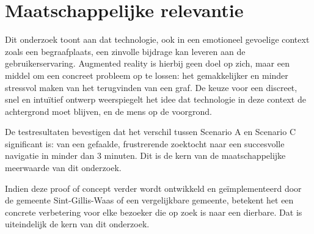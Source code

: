 \section{Maatschappelijke relevantie}

Dit onderzoek toont aan dat technologie, ook in een emotioneel gevoelige context
zoals een begraafplaats, een zinvolle bijdrage kan leveren aan de gebruikerservaring.
Augmented reality is hierbij geen doel op zich, maar een middel om een concreet
probleem op te lossen: het gemakkelijker en minder stressvol maken van het
terugvinden van een graf. De keuze voor een discreet, snel en intuïtief ontwerp
weerspiegelt het idee dat technologie in deze context de achtergrond moet
blijven, en de mens op de voorgrond.

De testresultaten bevestigen dat het verschil tussen Scenario A en Scenario C
significant is: van een gefaalde, frustrerende zoektocht naar een succesvolle
navigatie in minder dan 3 minuten. Dit is de kern van de maatschappelijke
meerwaarde van dit onderzoek.

Indien deze proof of concept verder wordt ontwikkeld en geïmplementeerd door de
gemeente Sint-Gillis-Waas of een vergelijkbare gemeente, betekent het een
concrete verbetering voor elke bezoeker die op zoek is naar een dierbare. Dat
is uiteindelijk de kern van dit onderzoek.